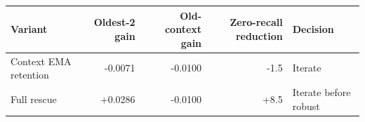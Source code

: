 \begin{tabular}{@{}lrrrl@{}}
\toprule
Variant & Oldest-2 gain & Old-context gain & Zero-recall reduction & Decision \\
\midrule
Context EMA retention & -0.0071 & -0.0100 & -1.5 & Iterate \\
Full rescue & +0.0286 & -0.0100 & +8.5 & Iterate before robust \\
\bottomrule
\end{tabular}
